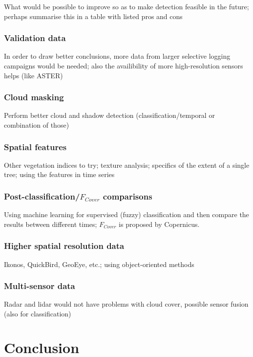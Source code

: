 \documentclass[a4paper,12pt]{scrbook}
\begin{document}
What would be possible to improve so as to make detection feasible in the future; perhaps summarise this in a table with listed pros and cons

\subsection{Validation data}

In order to draw better conclusions, more data from larger selective logging campaigns would be needed; also the availibility of more high-resolution sensors helps (like ASTER)

\subsection{Cloud masking}

Perform better cloud and shadow detection (classification/temporal or combination of those)

\subsection{Spatial features}

Other vegetation indices to try; texture analysis; specifics of the extent of a single tree; using the features in time series

\subsection{Post-classification/$F_{Cover}$ comparisons}

Using machine learning for supervised (fuzzy) classification and then compare the results between different times; $F_{Cover}$ is proposed by Copernicus.

\subsection{Higher spatial resolution data}

Ikonos, QuickBird, GeoEye, etc.; using object-oriented methods

\subsection{Multi-sensor data}

Radar and lidar would not have problems with cloud cover, possible sensor fusion (also for classification)

\chapter{Conclusion}
\end{document}
